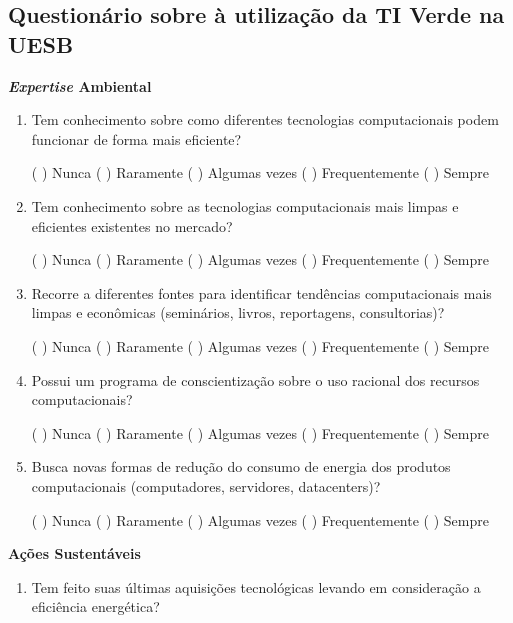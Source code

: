 \begin{apendicesenv} 

\partapendices
\chapter{Questionário sobre à utilização da TI Verde na UESB}
\textbf{\textit{Expertise} Ambiental}
\begin{enumerate}
    \item Tem conhecimento sobre como diferentes tecnologias computacionais podem funcionar de forma mais eficiente? 
    
    ( \space\space ) Nunca  ( \space\space ) Raramente  ( \space\space ) Algumas vezes  ( \space\space ) Frequentemente ( \space\space ) Sempre
    \item Tem conhecimento sobre as tecnologias computacionais mais limpas e eficientes existentes no mercado? 
    
    ( \space\space ) Nunca  ( \space\space ) Raramente  ( \space\space ) Algumas vezes  ( \space\space ) Frequentemente ( \space\space ) Sempre
    \item Recorre a diferentes fontes para identificar tendências computacionais mais limpas e econômicas (seminários, livros, reportagens, consultorias)? 
    
    ( \space\space ) Nunca  ( \space\space ) Raramente  ( \space\space ) Algumas vezes  ( \space\space ) Frequentemente ( \space\space ) Sempre
    \item Possui um programa de conscientização sobre o uso racional dos recursos computacionais? 
    
    ( \space\space ) Nunca  ( \space\space ) Raramente  ( \space\space ) Algumas vezes  ( \space\space ) Frequentemente ( \space\space ) Sempre
    \item Busca novas formas de redução do consumo de energia dos produtos computacionais (computadores, servidores, datacenters)? 
    
    ( \space\space ) Nunca  ( \space\space ) Raramente  ( \space\space ) Algumas vezes  ( \space\space ) Frequentemente ( \space\space ) Sempre
\end{enumerate}
    
\textbf{Ações Sustentáveis}

\begin{enumerate}
    \item Tem feito suas últimas aquisições tecnológicas levando em consideração a eficiência energética? 
    

\end{enumerate}
\end{apendicesenv}
